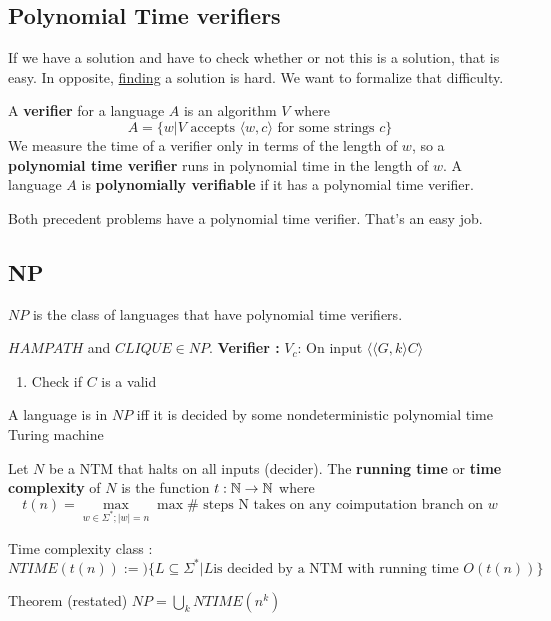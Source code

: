 \documentclass[12pt,a4paper]{article}
\newcommand{\<}{\langle}
\renewcommand{\>}{\rangle}
\begin{document}
\subsection{Polynomial Time verifiers}
If we have a solution and have to check whether or not this is a solution, that is easy.  In opposite, \uline{finding} a solution is hard. We want to formalize that difficulty.
\begin{blackbox}
     A \textbf{verifier} for a language $A$ is an algorithm $V$ where 
    \[A = \{w | V \text{ accepts } \langle w, c \rangle \text{ for some strings } c \}\]
    We measure the time of a verifier only in terms of the length of $w$, so a \textbf{polynomial time verifier} runs in polynomial time in the length of $w$. A language $A$ is \textbf{polynomially verifiable} if it has a polynomial time verifier.
\end{blackbox}
Both precedent problems have a polynomial time verifier. That's an easy job.

\subsection{NP}
\begin{blackbox}
     $NP$ is the class of languages that have polynomial time verifiers.
\end{blackbox}
$HAMPATH $ and $CLIQUE \in NP$. \textbf{Verifier :} $V_c$: On input $\langle\langle G,k\rangle C\rangle$
\begin{enumerate}
    \item Check if $C$ is a valid 
\end{enumerate}
\begin{blackbox}
     A language is in $NP$ iff it is decided by some nondeterministic polynomial time Turing machine
\end{blackbox}
Let $N$ be a NTM that halts on all inputs (decider). The \textbf{running time} or \textbf{time complexity} of $N$ is the function $t : \mathbb{N} \to \mathbb{N}$ where 
\[t(n) = \max_{w \in \Sigma^*; |w| = n} \max \# \text{ steps N takes on any coimputation branch on $w$}\]
\begin{blackbox}
    Time complexity class :
    \[NTIME(t(n)) :=) \{L \subseteq \Sigma^* | L \text{is decided by a NTM with running time }O(t(n))\}\]
\end{blackbox}
\begin{boite}
    Theorem (restated) $NP = \bigcup_k NTIME(n^k)$
\end{boite}
\end{document}
